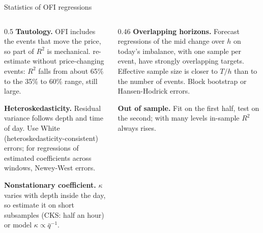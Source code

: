 \documentclass[aspectratio=169,10pt]{beamer}
\begin{document}
\begin{frame}{Statistics of OFI regressions}
  \small
  \begin{columns}[T]
    \begin{column}{0.5\textwidth}
      \textbf{Tautology.} OFI includes the events that move the price, so part of $R^2$ is mechanical. \citet{cont2014price} re-estimate without price-changing events: $R^2$ falls from about 65\% to the 35\% to 60\% range, still large.

      \vspace{0.3em}
      \textbf{Heteroskedasticity.} Residual variance follows depth and time of day. Use White (heteroskedasticity-consistent) errors; for regressions of estimated coefficients across windows, Newey-West errors.

      \vspace{0.3em}
      \textbf{Nonstationary coefficient.} $\kappa$ varies with depth inside the day, so estimate it on short subsamples (CKS: half an hour) or model $\kappa \propto \bar q^{-1}$.
    \end{column}
    \begin{column}{0.46\textwidth}
      \textbf{Overlapping horizons.} Forecast regressions of the mid change over $h$ on today's imbalance, with one sample per event, have strongly overlapping targets. Effective sample size is closer to $T/h$ than to the number of events. Block bootstrap or Hansen-Hodrick errors.

      \vspace{0.3em}
      \textbf{Out of sample.} Fit on the first half, test on the second; with many levels in-sample $R^2$ always rises.
    \end{column}
  \end{columns}
\end{frame}
\end{document}
